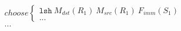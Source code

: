 \begin{align*}
&choose
\begin{cases}
  \texttt{lsh}\ M_{dst}(R_1)\ M_{src}(R_1)\ F_{imm}(S_1)\\
...
\end{cases}\\
&...\\
\end{align*}
